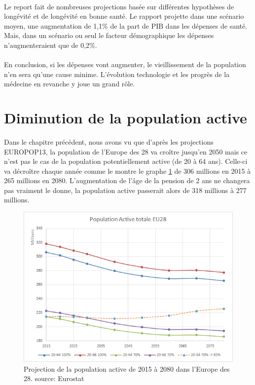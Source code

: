 \paragraph{}Le report fait de nombreuses projections basée sur différentes hypothèses de longévité et de longévité en bonne santé.  Le rapport projette dans une scénario moyen, une augmentation de 1,1\% de la part de PIB dans les dépenses de santé. Mais, dans un scénario ou seul le facteur démographique les dépenses n’augmenteraient que de 0,2\%\citep[pp.18]{ageing}. 

\paragraph{}En conclusion, si les dépenses vont augmenter, le vieillissement de la population n’en sera qu’une cause minime. L’évolution technologie et les progrès de la médecine en revanche y joue un grand rôle\citep[pp.120]{ageing}. 

\section{Diminution de la population active}
\paragraph{}Dans le chapitre précédent, nous avons vu que d’après les projections EUROPOP13, la population de l’Europe des 28 va croître jusqu’en 2050 mais ce n’est pas le cas de la population potentiellement active (de 20 à 64 ans). Celle-ci va décroître chaque année comme le montre le graphe \ref{active} de 306 millions en 2015 à 265 millions en 2080. L’augmentation de l’âge de la pension de 2 ans ne changera pas vraiment le donne, la population active passerait alors de 318 millions à 277 millions. 

\begin{figure}[h!]
    \begin{center}
        \includegraphics[scale=0.7]{document/active.png}
        \caption{Projection de la population active de 2015 à 2080 dans l'Europe des 28. source: Eurostat\citep{eurostat_europop13}}
        \label{active}
    \end{center}
\end{figure}

